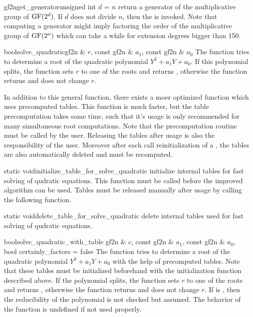 \begin{fcode}{gf2n}{get_generator}{unsigned int $d$ = $n$}
  return a generator of the multiplicative group of $\mathrm{GF}(2^d)$.  If $d$ does not divide $n$,
  then the \LEH is invoked.  Note that computing a generator might imply factoring the order of
  the multiplicative group of $\mathrm{GF}(2^n)$ which can take a while for extension degrees bigger
  than 150.
\end{fcode}

\begin{fcode}{bool}{solve_quadratic}{gf2n & $r$, const gf2n & $a_1$, const gf2n & $a_0$}
  The function tries to determine a root of the quadratic polynomial $Y^2 + a_1 Y + a_0$.  If
  this polynomial splits, the function sets $r$ to one of the roots and returns \TRUE, otherwise
  the function returns \FALSE and does not change $r$.
\end{fcode}

In addition to this general function, there exists a moer optimized function which uses
precomputed tables.  This function is much faster, but the table precomputation takes some time,
such that it's usage is only recommended for many simultaneous root computations.  Note that the
precomputation routine must be called by the user.  Releasing the tables after usage is also the
responsibility of the user.  Moreover after each call reinitialization of a , the
tables are also automatically deleted and must be recomputed.


\begin{fcode}{static void}{initialize_table_for_solve_quadratic}{}
  initialize internal tables for fast solving of qudratic equations.  This function must be
  called before the improved algorithm can be used.  Tables must be released manually after
  usage by calling the following function.
\end{fcode}

\begin{fcode}{static void}{delete_table_for_solve_quadratic}{}
  delete internal tables used for fast solving of qudratic equations.
\end{fcode}

\begin{fcode}{bool}{solve_quadratic_with_table}{ gf2n & $c$, const gf2n & $a_1$, const gf2n & $a_0$,
    bool certainly_factors = false}%
  The function tries to determine a root of the quadratic polynomial $Y^2 + a_1 Y + a_0$ with the
  help of precomputed tables.  Note that these tables must be initialized beforehand with the
  initialization function described above.  If the polynomial splits, the function sets $r$ to
  one of the roots and returns \TRUE, otherwise the function returns \FALSE and does not change
  $r$.  If  is \TRUE, then the reducibility of the polynomial is not
  checked but assumed.  The behavior of the function is undefined if not used properly.
\end{fcode}


